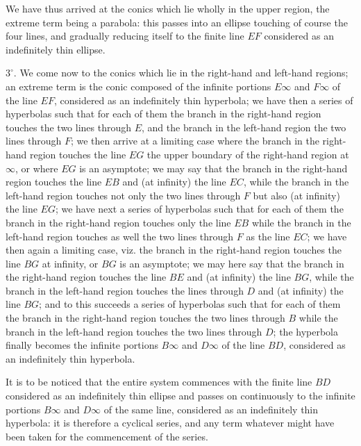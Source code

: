 \documentclass[11pt,a4paper]{article}
\theoremstyle{plain}
\begin{document}
We have thus arrived at the conics which lie wholly in the upper region, the extreme term being a parabola: this passes into an ellipse touching of course the four lines, and gradually reducing itself to the finite line $EF$ considered as an indefinitely thin ellipse.

$3^\circ$. We come now to the conics which lie in the right-hand and left-hand regions; an extreme term is the conic composed of the infinite portions $E\infty$ and $F\infty$ of the line $EF$, considered as an indefinitely thin hyperbola; we have then a series of hyperbolas such that for each of them the branch in the right-hand region touches the two lines through $E$, and the branch in the left-hand region the two lines through $F$; we then arrive at a limiting case where the branch in the right-hand region touches the line $EG$ the upper boundary of the right-hand region at $\infty$, or where $EG$ is an asymptote; we may say that the branch in the right-hand region touches the line $EB$ and (at infinity) the line $EC$, while the branch in the left-hand region touches not only the two lines through $F$ but also (at infinity) the line $EG$; we have next a series of hyperbolas such that for each of them the branch in the right-hand region touches only the line $EB$ while the branch in the left-hand region touches as well the two lines through $F$ as the line $EC$; we have then again a limiting case, viz. the branch in the right-hand region touches the line $BG$ at infinity, or $BG$ is an asymptote; we may here say that the branch in the right-hand region touches the line $BE$ and (at infinity) the line $BG$, while the branch in the left-hand region touches the lines through $D$ and (at infinity) the line $BG$; and to this succeeds a series of hyperbolas such that for each of them the branch in the right-hand region touches the two lines through $B$ while the branch in the left-hand region touches the two lines through $D$; the hyperbola finally becomes the infinite portions $B\infty$ and $D\infty$ of the line $BD$, considered as an indefinitely thin hyperbola.

It is to be noticed that the entire system commences with the finite line $BD$ considered as an indefinitely thin ellipse and passes on continuously to the infinite portions $B\infty$ and $D\infty$ of the same line, considered as an indefinitely thin hyperbola: it is therefore a cyclical series, and any term whatever might have been taken for the commencement of the series.


\newpage
\end{document}
